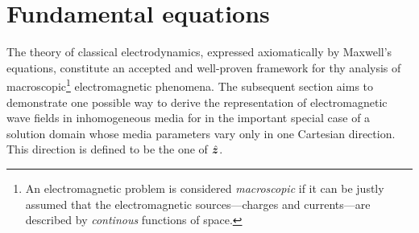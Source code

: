 \section{Fundamental equations}
\label{sec:em_fundamental_equations}

The theory of classical electrodynamics, expressed axiomatically by Maxwell's
equations, constitute an accepted and well-proven framework for thy analysis of
macroscopic\footnote{An electromagnetic problem is considered \emph{macroscopic}
if it can be justly assumed that the electromagnetic sources---charges and
currents---are described by \emph{continous} functions of space.}
electromagnetic phenomena.
The subsequent section aims to demonstrate one possible way to derive the
representation of electromagnetic wave fields in inhomogeneous media for in the
important special case of a solution domain whose media parameters vary only in
one Cartesian direction.
This direction is defined to be the one of $\uv{z}$.

